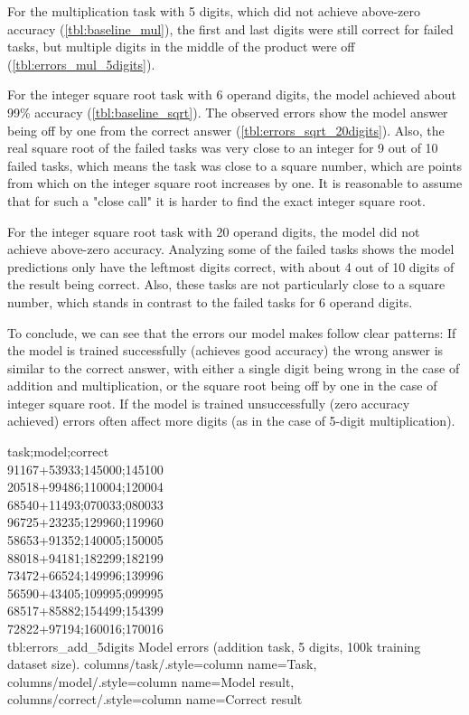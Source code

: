 For the multiplication task with 5 digits, which did not achieve above-zero accuracy (\cref{tbl:baseline_mul}), the first and last digits were still correct for failed tasks, but multiple digits in the middle of the product were off (\cref{tbl:errors_mul_5digits}).


For the integer square root task with 6 operand digits, the model achieved about 99\% accuracy (\cref{tbl:baseline_sqrt}). The observed errors show the model answer being off by one from the correct answer (\cref{tbl:errors_sqrt_20digits}). Also, the real square root of the failed tasks was very close to an integer for 9 out of 10 failed tasks, which means the task was close to a square number, which are points from which on the integer square root increases by one. It is reasonable to assume that for such a "close call" it is harder to find the exact integer square root.

For the integer square root task with 20 operand digits, the model did not achieve above-zero accuracy. Analyzing some of the failed tasks shows the model predictions only have the leftmost digits correct, with about 4 out of 10 digits of the result being correct. Also, these tasks are not particularly close to a square number, which stands in contrast to the failed tasks for 6 operand digits.

To conclude, we can see that the errors our model makes follow clear patterns: If the model is trained successfully (achieves good accuracy) the wrong answer is similar to the correct answer, with either a single digit being wrong in the case of addition and multiplication, or the square root being off by one in the case of integer square root. If the model is trained unsuccessfully (zero accuracy achieved) errors often affect more digits (as in the case of 5-digit multiplication).





{
	task;model;correct\\
	91167+53933;145000;145100\\
	20518+99486;110004;120004\\
	68540+11493;070033;080033\\
	96725+23235;129960;119960\\
	58653+91352;140005;150005\\
	88018+94181;182299;182199\\
	73472+66524;149996;139996\\
	56590+43405;109995;099995\\
	68517+85882;154499;154399\\
	72822+97194;160016;170016\\
}
{tbl:errors_add_5digits}
{
	Model errors (addition task, 5 digits, 100k training dataset size).
}
{
	columns/task/.style={column name={Task}},
	columns/model/.style={column name={Model result}},
	columns/correct/.style={column name={Correct result}}
}

